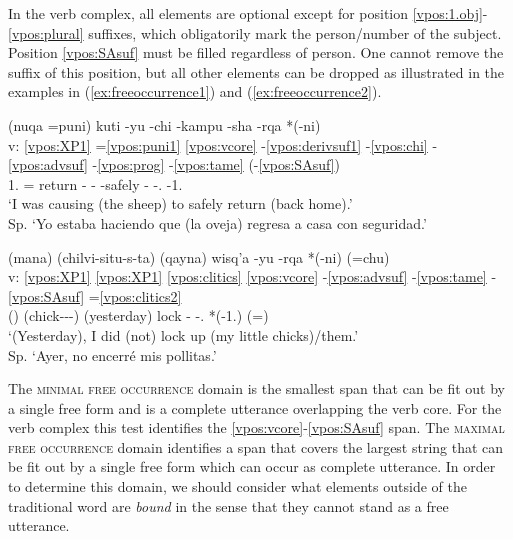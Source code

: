 \documentclass[output=paper]{langscibook}
\begin{document}

In the verb complex, all elements are optional except for position \ref{vpos:1.obj}-\ref{vpos:plural} suffixes, which obligatorily mark the person/number of the subject. Position \ref{vpos:SAsuf} must be filled regardless of person. One cannot remove the suffix of this position, but all other elements can be dropped as illustrated in the examples in (\ref{ex:freeoccurrence1}) and (\ref{ex:freeoccurrence2}).

\ea \label{ex:freeoccurrence1}
	\glll {} (nuqa	=puni)	kuti -yu -chi -kampu -sha -rqa *(-ni) \\
        v: \ref{vpos:XP1} =\ref{vpos:puni1} \ref{vpos:vcore} -\ref{vpos:derivsuf1} -\ref{vpos:chi} -\ref{vpos:advsuf} -\ref{vpos:prog} -\ref{vpos:tame} (-\ref{vpos:SAsuf})  \\
		{} 1.\Sg{} =\Emph{} return -\Cmpl{} -\Caus{} -safely -\Prog{} -\Pst{}.\Rep{} -1.\Sg{} \\
	\glt `I was causing (the sheep) to safely return (back home).' \\ Sp. `Yo estaba haciendo que (la oveja) regresa a casa con seguridad.' \hfill 
\z

\ea \label{ex:freeoccurrence2}
	\glll {} (mana) (chilvi-situ-s-ta) (qayna) wisq'a -yu -rqa *(-ni) (=chu) \\
            v: \ref{vpos:XP1} \ref{vpos:XP1} \ref{vpos:clitics} \ref{vpos:vcore} -\ref{vpos:advsuf} -\ref{vpos:tame} -\ref{vpos:SAsuf} =\ref{vpos:clitics2}  \\
            {} (\Neg{}) (chick-\Dim{}-\Poss{}-\Acc{}) (yesterday) lock -\Cmpl{} -\Pst{}.\Rep{} *(-1.\Sg{}) (=\Neg{}) \\
	\glt `(Yesterday), I did (not) lock up (my little chicks)/them.' \\ Sp. `Ayer, no encerré mis pollitas.'   
\z

The \textsc{minimal free occurrence} domain is the smallest span that can be fit out by a single free form and is a complete utterance overlapping the verb core. For the verb complex this test identifies the \ref{vpos:vcore}-\ref{vpos:SAsuf} span. The \textsc{maximal free occurrence} domain identifies a span that covers the largest string that can be fit out by a single free form which can occur as complete utterance. In order to determine this domain, we should consider what elements outside of the traditional word are \textit{bound} in the sense that they cannot stand as a free utterance.
\end{document}
